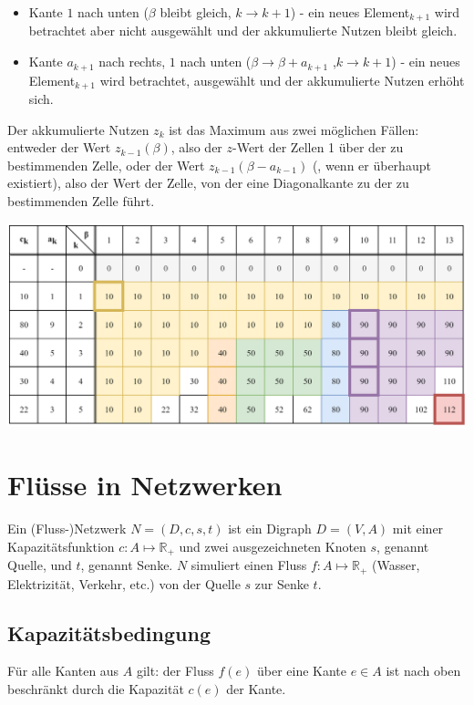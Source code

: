 \documentclass[10pt,a4paper,landscape]{article}
\begin{document}
\begin{multicols*}{2}
\begin{itemize}
        \item Kante $1$ nach unten  ($\beta$ bleibt gleich, $k \rightarrow k + 1$) - ein neues Element$_{k+1}$ wird betrachtet aber nicht ausgewählt und der akkumulierte Nutzen bleibt gleich. 
        \item Kante $a_{k+1}$ nach rechts, $1$ nach unten ($\beta \rightarrow \beta + a_{k+1}$ ,$k \rightarrow k + 1$) - ein neues Element$_{k+1}$ wird betrachtet, ausgewählt und der akkumulierte Nutzen erhöht sich.
    \end{itemize}
    Der akkumulierte Nutzen $z_k$ ist das Maximum aus zwei möglichen Fällen: entweder der Wert $z_{k-1}(\beta)$, also der $z$-Wert der Zellen 1 über der zu bestimmenden Zelle,
    oder der Wert $z_{k-1}(\beta-a_{k-1})$ (, wenn er überhaupt existiert), also der Wert der Zelle, von der eine Diagonalkante zu der zu bestimmenden Zelle führt.   
    \begin{center}
        \includegraphics[width=0.95\linewidth,keepaspectratio]{KSP.png}
    \end{center}
    

\section{ Flüsse in Netzwerken }
    Ein (Fluss-)Netzwerk $N = (D,c,s,t)$ ist ein Digraph $D = (V,A)$ mit einer Kapazitätsfunktion $c: A \mapsto \mathbb{R}_+$ und zwei ausgezeichneten 
    Knoten $s$, genannt Quelle, und $t$, genannt Senke. $N$ simuliert einen Fluss $f: A \mapsto \mathbb{R}_+$ (Wasser, Elektrizität, Verkehr, etc.) 
    von der Quelle $s$ zur Senke $t$.

    \subsection*{ Kapazitätsbedingung }
    Für alle Kanten aus $A$ gilt: der Fluss $f(e)$ über eine Kante $e \in A$ ist nach oben beschränkt durch die Kapazität $c(e)$ der Kante.
    

\end{multicols*}
\end{document}
